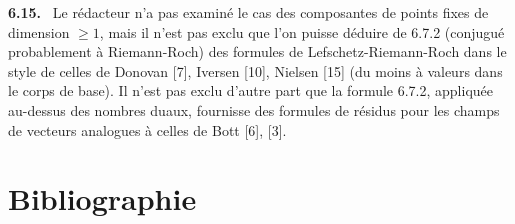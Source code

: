 \documentclass[11pt]{article}
\newenvironment{statement}[1]{\par\medskip\noindent\textbf{#1.}\ }{\par\medskip}
\begin{document}
\begin{statement}{6.15}
Le rédacteur n'a pas examiné le cas des composantes de points fixes de dimension $\ge 1$, mais il n'est pas exclu que l'on puisse déduire de 6.7.2 (conjugué probablement à Riemann-Roch) des formules de Lefschetz-Riemann-Roch dans le style de celles de Donovan [7], Iversen [10], Nielsen [15] (du moins à valeurs dans le corps de base). Il n'est pas exclu d'autre part que la formule 6.7.2, appliquée au-dessus des nombres duaux, fournisse des formules de résidus pour les champs de vecteurs analogues à celles de Bott [6], [3].
\end{statement}

\section*{Bibliographie}
\end{document}
